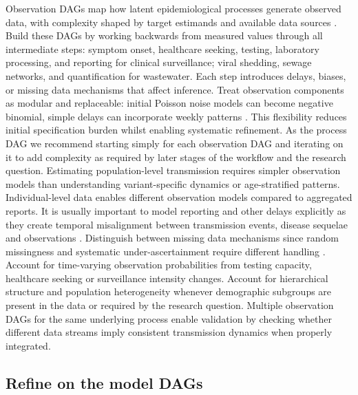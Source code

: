 \documentclass{article}
\begin{document}
Observation DAGs map how latent epidemiological processes generate observed data, with complexity shaped by target estimands and available data sources \citep{deangelis2018analysing}.
Build these DAGs by working backwards from measured values through all intermediate steps: symptom onset, healthcare seeking, testing, laboratory processing, and reporting for clinical surveillance; viral shedding, sewage networks, and quantification for wastewater.
Each step introduces delays, biases, or missing data mechanisms that affect inference.
Treat observation components as modular and replaceable: initial Poisson noise models can become negative binomial, simple delays can incorporate weekly patterns \citep{gelman2020bayesian}.
This flexibility reduces initial specification burden whilst enabling systematic refinement.
As the process DAG we recommend starting simply for each observation DAG and iterating on it to add complexity as required by later stages of the workflow and the research question.
Estimating population-level transmission requires simpler observation models than understanding variant-specific dynamics or age-stratified patterns.
Individual-level data enables different observation models compared to aggregated reports.
It is usually important to model reporting and other delays explicitly as they create temporal misalignment between transmission events, disease sequelae and observations \citep{seaman2022nowcasting}.
Distinguish between missing data mechanisms since random missingness and systematic under-ascertainment require different handling \citep{sherratt2021exploring}.
Account for time-varying observation probabilities from testing capacity, healthcare seeking or surveillance intensity changes.
Account for hierarchical structure and population heterogeneity whenever demographic subgroups are present in the data or required by the research question.
Multiple observation DAGs for the same underlying process enable validation by checking whether different data streams imply consistent transmission dynamics when properly integrated.

\subsection{Refine on the model DAGs}
\end{document}
